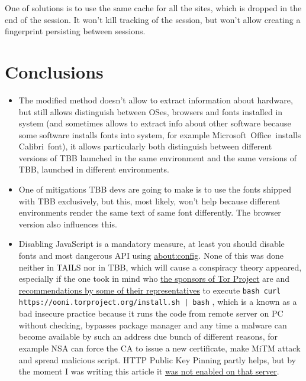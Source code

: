 \documentclass[letterpaper,14pt]{article}
\begin{document}
One of solutions is to use the same cache for all the sites, which is dropped in the end of the session. It won't kill tracking of the session, but won't allow creating a fingerprint persisting between sessions.

\section{Conclusions}\label{conclusions}

\begin{itemize}
\itemsep1pt\parskip0pt
\item
  The modified method doesn't allow to extract information about hardware, but still allows distinguish between OSes, browsers and fonts installed in system (and sometimes allows to extract info about other software because some software installs fonts into system, for example Microsoft\texttrademark\ Office\texttrademark\ installs Calibri\texttrademark\ font), it allows particularly both distinguish between different versions of TBB launched in the same environment and the same versions of TBB, launched in different environments.
\item
  One of mitigations TBB devs are going to make is to use the fonts shipped with TBB exclusively, but this, most likely, won't help because different environments render the same text of same font differently. The browser version also influences this.
\item
  Disabling JavaScript is a mandatory measure, at least you should disable fonts and most dangerous API using \url{about:config}. None of this was done neither in TAILS nor in TBB, which will cause a conspiracy theory appeared, especially if the one took in mind who \href{https://www.torproject.org/about/sponsors.htmml.en}{the sponsors of Tor Project} are and \href{https://www.youtube.com/watch?v=pRrFWwA-47U\&t=21m39s}{recommendations by some of their representatives} to execute
  \lstinline!bash curl https://ooni.torproject.org/install.sh | bash!
  , which is a known as a bad insecure practice because it runs the code from remote server on PC without checking, bypasses package manager and any time a malware can become available by such an address due bunch of different reasons, for example NSA can force the CA to issue a new certificate, make MiTM attack and spread malicious script. HTTP Public Key Pinning partly helps, but by the moment I was writing this article it \href{https://www.ssllabs.com/ssltest/analyze.html?d=torproject.org}{was not enabled on that server}.\\

\end{itemize}
\end{document}
